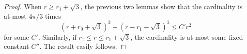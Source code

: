 \begin{proof}  When $r \ge r_1+\sqrt3$, the previous two lemmas show
that the cardinality is at most $4\pi/3$ times
\begin{displaymath}
  (r +r_0 + \sqrt3)^3 - (r - r_1 - \sqrt3)^3 \le C' r^2
\end{displaymath}
for some $C'$.  Similarly, if $r_1\le r\le r_1+\sqrt3$, the
cardinality is at most some fixed constant $C''$.  The result
easily follows.
\end{proof}

